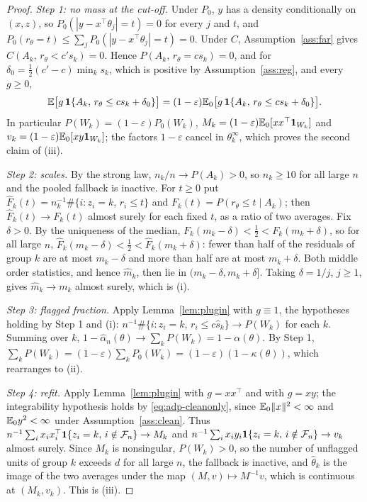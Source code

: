\begin{proof}
\emph{Step 1: no mass at the cut-off.} Under $P_0$, $y$ has a density conditionally on
$(x,z)$, so $P_0(|y-x^{\top}\theta_j|=t)=0$ for every $j$ and $t$, and
$P_0(r_\theta=t)\le\sum_jP_0(|y-x^{\top}\theta_j|=t)=0$. Under $C$,
Assumption~\ref{ass:far} gives $C(A_k,\,r_\theta<c's_k)=0$. Hence
$P(A_k,\,r_\theta=cs_k)=0$, and for $\delta_0=\tfrac12(c'-c)\min_ks_k$, which is positive by
Assumption~\ref{ass:reg}, and every $g\ge0$,
\begin{equation}
\mathbb{E}\bigl[g\,\mathbf{1}\{A_k,\,r_\theta\le cs_k+\delta_0\}\bigr]
=(1-\varepsilon)\mathbb{E}_0\bigl[g\,\mathbf{1}\{A_k,\,r_\theta\le cs_k+\delta_0\}\bigr].
\label{eq:adp-cleanonly}
\end{equation}
In particular $P(W_k)=(1-\varepsilon)P_0(W_k)$, $M_k=(1-\varepsilon)\mathbb{E}_0[xx^{\top}\mathbf{1}_{W_k}]$
and $v_k=(1-\varepsilon)\mathbb{E}_0[xy\mathbf{1}_{W_k}]$; the factors $1-\varepsilon$ cancel in
$\theta^{\infty}_k$, which proves the second claim of (iii).

\emph{Step 2: scales.} By the strong law, $n_k/n\to P(A_k)>0$, so $n_k\ge10$ for all large
$n$ and the pooled fallback is inactive. For $t\ge0$ put
$\hat F_k(t)=n_k^{-1}\#\{i:z_i=k,\,r_i\le t\}$ and $F_k(t)=P(r_\theta\le t\mid A_k)$; then
$\hat F_k(t)\to F_k(t)$ almost surely for each fixed $t$, as a ratio of two averages. Fix
$\delta>0$. By the uniqueness of the median, $F_k(m_k-\delta)<\tfrac12<F_k(m_k+\delta)$, so
for all large $n$, $\hat F_k(m_k-\delta)<\tfrac12<\hat F_k(m_k+\delta)$: fewer than half of
the residuals of group $k$ are at most $m_k-\delta$ and more than half are at most
$m_k+\delta$. Both middle order statistics, and hence $\hat m_k$, then lie in
$(m_k-\delta,m_k+\delta]$. Taking $\delta=1/j$, $j\ge1$, gives $\hat m_k\to m_k$ almost
surely, which is (i).

\emph{Step 3: flagged fraction.} Apply Lemma~\ref{lem:plugin} with $g\equiv1$, the
hypotheses holding by Step 1 and (i): $n^{-1}\#\{i:z_i=k,\,r_i\le c\hat s_k\}\to P(W_k)$ for
each $k$. Summing over $k$, $1-\hat\alpha_n(\theta)\to\sum_kP(W_k)=1-\alpha(\theta)$. By
Step 1, $\sum_kP(W_k)=(1-\varepsilon)\sum_kP_0(W_k)=(1-\varepsilon)(1-\kappa(\theta))$, which
rearranges to (ii).

\emph{Step 4: refit.} Apply Lemma~\ref{lem:plugin} with $g=xx^{\top}$ and with $g=xy$;
the integrability hypothesis holds by \eqref{eq:adp-cleanonly}, since
$\mathbb{E}_0\|x\|^{2}<\infty$ and $\mathbb{E}_0y^{2}<\infty$ under Assumption~\ref{ass:clean}. Thus
$n^{-1}\sum_ix_ix_i^{\top}\mathbf{1}\{z_i=k,\,i\notin\mathcal F_n\}\to M_k$ and
$n^{-1}\sum_ix_iy_i\mathbf{1}\{z_i=k,\,i\notin\mathcal F_n\}\to v_k$ almost surely. Since $M_k$ is
nonsingular, $P(W_k)>0$, so the number of unflagged units of group $k$ exceeds $d$ for all
large $n$, the fallback is inactive, and $\hat\theta_k$ is the image of the two averages
under the map $(M,v)\mapsto M^{-1}v$, which is continuous at $(M_k,v_k)$. This is (iii).
\end{proof}

